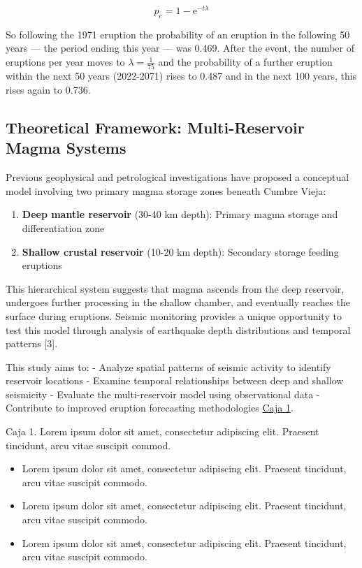 \documentclass[
  spanish,
  letterpaper,
]{book}
\providecommand{\tightlist}{%
  \setlength{\itemsep}{0pt}\setlength{\parskip}{0pt}}
\begin{document}
\[
p_e = 1-\mathrm{e}^{-t \lambda}
\]

So following the 1971 eruption the probability of an eruption in the
following 50 years --- the period ending this year --- was 0.469. After
the event, the number of eruptions per year moves to
\(\lambda=\frac{1}{75}\) and the probability of a further eruption
within the next 50 years (2022-2071) rises to 0.487 and in the next 100
years, this rises again to 0.736.

\subsection{Theoretical Framework: Multi-Reservoir Magma
Systems}\label{theoretical-framework-multi-reservoir-magma-systems}

Previous geophysical and petrological investigations have proposed a
conceptual model involving two primary magma storage zones beneath
Cumbre Vieja:

\begin{enumerate}
\def\labelenumi{\arabic{enumi}.}
\tightlist
\item
  \textbf{Deep mantle reservoir} (30-40 km depth): Primary magma storage
  and differentiation zone
\item
  \textbf{Shallow crustal reservoir} (10-20 km depth): Secondary storage
  feeding eruptions
\end{enumerate}

This hierarchical system suggests that magma ascends from the deep
reservoir, undergoes further processing in the shallow chamber, and
eventually reaches the surface during eruptions. Seismic monitoring
provides a unique opportunity to test this model through analysis of
earthquake depth distributions and temporal patterns {[}3{]}.

This study aims to: - Analyze spatial patterns of seismic activity to
identify reservoir locations - Examine temporal relationships between
deep and shallow seismicity - Evaluate the multi-reservoir model using
observational data - Contribute to improved eruption forecasting
methodologies \hyperref[box1]{Caja 1}.

\begin{tcolorbox}[enhanced jigsaw, rightrule=.15mm, colframe=quarto-callout-important-color-frame, opacityback=0, arc=.35mm, bottomrule=.15mm, toprule=.15mm, breakable, colback=white, leftrule=.75mm, left=2mm]

Caja 1. Lorem ipsum dolor sit amet, consectetur adipiscing elit.
Praesent tincidunt, arcu vitae suscipit commod.

\begin{itemize}
\tightlist
\item
  Lorem ipsum dolor sit amet, consectetur adipiscing elit. Praesent
  tincidunt, arcu vitae suscipit commodo.
\item
  Lorem ipsum dolor sit amet, consectetur adipiscing elit. Praesent
  tincidunt, arcu vitae suscipit commodo.
\item
  Lorem ipsum dolor sit amet, consectetur adipiscing elit. Praesent
  tincidunt, arcu vitae suscipit commodo.
\end{itemize}

\end{tcolorbox}
\end{document}
